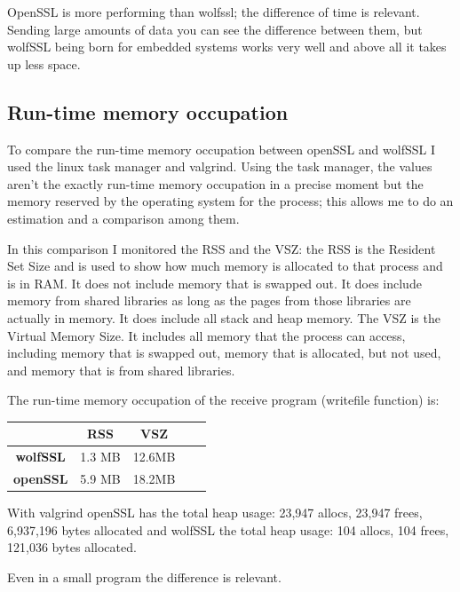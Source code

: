 \documentclass[a4paper,12pt]{article}
\begin{document}
OpenSSL is more performing than wolfssl; the difference of time is relevant.
Sending large amounts of data you can see the difference between them, but wolfSSL being born for embedded systems works very well and above all it takes up less space.

\subsection{Run-time memory occupation}
To compare the run-time memory occupation between openSSL and wolfSSL I used the linux task manager and valgrind. Using the task manager, the values aren't the exactly run-time memory occupation in a precise moment but the memory reserved by the operating system for the process; this allows me to do an estimation and a comparison among them.

In this comparison I monitored the RSS and the VSZ:
the RSS is the Resident Set Size and is used to show how much memory is allocated to that process and is in RAM. It does not include memory that is swapped out. It does include memory from shared libraries as long as the pages from those libraries are actually in memory. It does include all stack and heap memory.
The VSZ is the Virtual Memory Size. It includes all memory that the process can access, including memory that is swapped out, memory that is allocated, but not used, and memory that is from shared libraries.

The run-time memory occupation of the receive program (writefile function) is:
\\
\begin{tabular}{ ||c|c|c|c|c|| } 
 \hline
 & RSS & VSZ\\ 
 \hline
 \textbf{wolfSSL} &1.3 MB& 12.6MB\\ 
 \hline
 \textbf{openSSL} &5.9 MB& 18.2MB\\ 
 \hline
\end{tabular}
\newline
\newline
With valgrind openSSL has the total heap usage: 23,947 allocs, 23,947 frees, 6,937,196 bytes allocated and wolfSSL the total heap usage: 104 allocs, 104 frees, 121,036 bytes allocated.

Even in a small program the difference is relevant.
\end{document}
